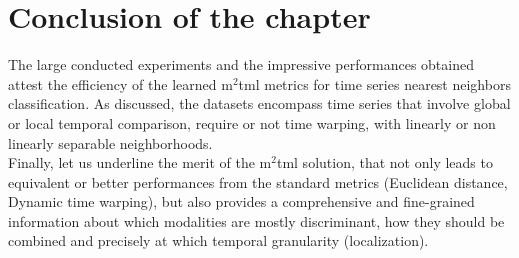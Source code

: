 \section{Conclusion of the chapter}
The large conducted experiments and the impressive performances obtained  attest the efficiency of the learned {\sc m}$^2${\sc tml} metrics for time series nearest neighbors classification. As discussed, the datasets encompass time series that involve global or local temporal comparison, require or not time warping, with linearly or non linearly separable neighborhoods. \\
Finally, let us underline the merit of the {\sc m}$^2${\sc tml}  solution, that not only leads to equivalent or better performances from the standard metrics (Euclidean distance, Dynamic time warping), but also provides a comprehensive and fine-grained information about  which modalities are mostly discriminant, how they should be combined and precisely at which temporal granularity (localization). 